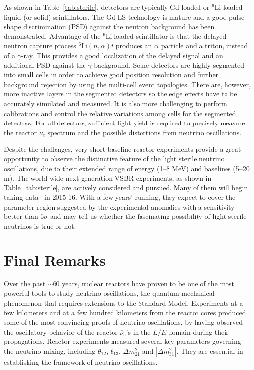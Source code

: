 \documentclass[aps,twocolumn,preprintnumbers,amsmath,superscriptaddress,amssymb,floats,nofootinbib]{revtex4-1}
\begin{document}
As shown in Table~\ref{tab:sterile}, detectors are typically Gd-loaded or $^{6}$Li-loaded liquid (or solid) scintillators. 
The Gd-LS technology is mature and a good pulse shape discrimination (PSD) against the neutron background has been demonstrated. 
Advantage of the $^{6}$Li-loaded scintillator is that the 
delayed neutron capture process $^{6}$Li$(n,\alpha)t$ produces an $\alpha$ particle and a triton, instead of a $\gamma$-ray. 
This provides a good localization of the delayed signal and an additional PSD against the $\gamma$ background. 
Some detectors are highly segmented into small cells in order to achieve good position resolution and further background rejection by using the multi-cell event topologies. 
There are, however, more inactive layers in the segmented detectors so the edge effects have to be accurately simulated and measured.
It is also more challenging to perform calibrations and control the relative variations among cells for the segmented detectors.
For all detectors, sufficient light yield is required to precisely measure the reactor $\bar\nu_e$ spectrum and the possible distortions from neutrino oscillations.


Despite the challenges, very short-baseline reactor experiments provide a great opportunity to observe the distinctive feature of the light sterile neutrino oscillations, due to their extended range of energy (1--8 MeV) and baselines (5--20 m). 
The world-wide next-generation VSBR experiments, as shown in Table~\ref{tab:sterile}, are actively considered and pursued.
Many of them will begin taking data~\cite{Lhuillier-Neutrino14} in 2015-16. With a few years' running, they expect to cover the parameter region 
suggested by the experimental anomalies with a sensitivity better than $5\sigma$ and 
may tell us whether the fascinating possibility of light sterile neutrinos is true or not.


\section{Final Remarks} 
\label{sec:final}

Over the past $\sim$60 years, nuclear reactors have proven to be one of the most powerful tools to study neutrino oscillations, the quantum-mechanical phenomenon that requires extensions to the Standard Model. Experiments at a few kilometers and at a few hundred kilometers from the reactor cores produced some of the most convincing proofs of neutrino oscillations, by having observed the oscillatory behavior of the reactor $\bar\nu_e$'s in the $L/E$ domain during their propagations. Reactor experiments measured several key parameters governing the neutrino mixing, including $\theta_{12}$, $\theta_{13}$, $\Delta{m}^2_{21}$ and $|\Delta{m}^2_{31}|$. They are essential in establishing the framework of neutrino oscillations.
\end{document}
